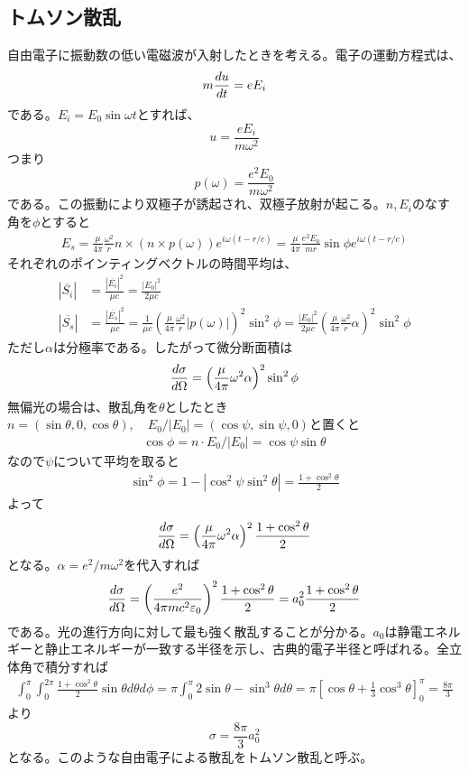 \subsection{トムソン散乱}
    自由電子に振動数の低い電磁波が入射したときを考える。電子の運動方程式は、
        \[m\de[u]{t} = eE_i\]
    である。$E_i = E_0\sin\omega t$とすれば、
        \[u = \frac{eE_i}{m\omega^2}\]
    つまり
        \[p(\omega) = \frac{e^2E_0}{m\omega^2}\]
    である。この振動により双極子が誘起され、双極子放射が起こる。$n,E_i$のなす角を$\phi$とすると
    \begin{align*}
        E_s = \frac{\mu}{4\pi}\frac{\omega^2}{r}{n\times(n\times p(\omega))}e^{i\omega(t - r/c)} = \frac{\mu}{4\pi}\frac{e^2E_0}{mr}\sin\phi e^{i\omega(t - r/c)}
    \end{align*}
    それぞれのポインティングベクトルの時間平均は、
    \begin{align*}
        |\overline{S_i}| &= \frac{|\overline{E_i}|^2}{\mu c} = \frac{|E_0|^2}{2\mu c}\\
        |\overline{S_s}| &= \frac{|\overline{E_s}|^2}{\mu c} = \frac{1}{\mu c}\left(\frac{\mu}{4\pi}\frac{\omega^2}{r}|p(\omega)|\right)^2\sin^2\phi = \frac{|E_0|^2}{2\mu c}\left(\frac{\mu}{4\pi}\frac{\omega^2}{r}\alpha\right)^2\sin^2\phi
    \end{align*}
    ただし$\alpha$は分極率である。したがって微分断面積は
    \begin{align*}
        \de[\sigma]{\Omega} = \left(\frac{\mu}{4\pi}\omega^2\alpha\right)^2\sin^2\phi           
    \end{align*}
    無偏光の場合は、散乱角を$\theta$としたとき$n = (\sin\theta, 0, \cos\theta), \quad E_0 / |E_0| = (\cos\psi, \sin\psi, 0)$と置くと
    \begin{align*}
        \cos\phi = n \cdot E_0 / |E_0| = \cos\psi\sin\theta
    \end{align*}
    なので$\psi$について平均を取ると
    \begin{align*}
        \sin^2\phi = 1 - |\cos^2\psi\sin^2\theta| = \frac{1 + \cos^2\theta}{2}
    \end{align*}
    よって
    \begin{align*}
        \de[\sigma]{\Omega} = \left(\frac{\mu}{4\pi}\omega^2\alpha\right)^2 \frac{1 + \cos^2\theta}{2}
    \end{align*}
    となる。$\alpha = e^2 / m\omega^2$を代入すれば
    \begin{align*}
        \de[\sigma]{\Omega} = \left(\frac{e^2}{4\pi mc^2\epsilon_0}\right)^2 \frac{1 + \cos^2\theta}{2} = a_0^2\frac{1 + \cos^2\theta}{2}
    \end{align*}
    である。光の進行方向に対して最も強く散乱することが分かる。$a_0$は静電エネルギーと静止エネルギーが一致する半径を示し、古典的電子半径と呼ばれる。全立体角で積分すれば
    \begin{align*}
        \int_0^\pi\int_0^{2\pi} \frac{1 + \cos^2\theta}{2}\sin\theta d\theta d\phi = \pi \int_0^\pi 2\sin\theta - \sin^3\theta d\theta = \pi \left[\cos\theta + \frac{1}{3}\cos^3\theta\right]_0^\pi = \frac{8\pi}{3}
    \end{align*}
    より
        \[\sigma = \frac{8\pi}{3}a_0^2\]
    となる。このような自由電子による散乱をトムソン散乱と呼ぶ。

